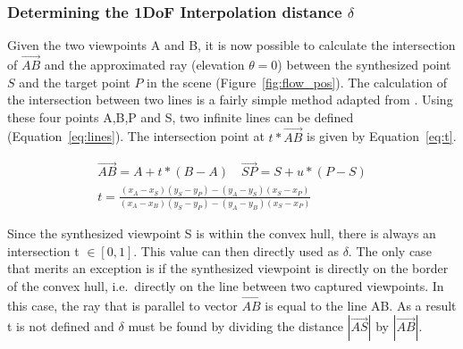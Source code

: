 \subsubsection{Determining the 1DoF Interpolation distance $\delta$}
Given the two viewpoints A and B, it is now possible to calculate the intersection of $\overrightarrow{AB}$ and the approximated ray (elevation $\theta = 0$) between the synthesized point $S$ and the target point $P$ in the scene (Figure~\ref{fig:flow_pos}). The calculation of the intersection between two lines is a fairly simple method adapted from \cite{lineline}. Using these four points A,B,P and S, two infinite lines can be defined (Equation~\ref{eq:lines}). The intersection point at $t * \overrightarrow{AB}$ is given by Equation~\ref{eq:t}.

\begin{align}
  \overrightarrow{AB} = A + t * (B-A) \quad \overrightarrow{SP} = S + u * (P-S) \label{eq:lines} \\
  t = \frac{(x_A - x_S)(y_S - y_P) - (y_A - y_S)(x_S - x_P)}{(x_A - x_B)(y_S - y_P) - (y_A - y_B)(x_S - x_P)} \label{eq:t}
\end{align}

Since the synthesized viewpoint S is within the convex hull, there is always an intersection t $\in [0,1]$. This value can then directly used as $\delta$. The only case that merits an exception is if the synthesized viewpoint is directly on the border of the convex hull, i.e.\ directly on the line between two captured viewpoints. In this case, the ray that is parallel to vector $\overrightarrow{AB}$ is equal to the line AB. As a result t is not defined and $\delta$ must be found by dividing the distance $|\overrightarrow{AS}|$ by $|\overrightarrow{AB}|$.


